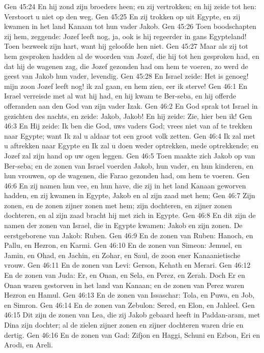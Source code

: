 Gen 45:24  En hij zond zijn broeders heen; en zij vertrokken; en hij zeide tot hen: Verstoort u niet op den weg.
Gen 45:25  En zij trokken op uit Egypte, en zij kwamen in het land Kanaan tot hun vader Jakob.
Gen 45:26  Toen boodschapten zij hem, zeggende: Jozef leeft nog, ja, ook is hij regeerder in gans Egypteland! Toen bezweek zijn hart, want hij geloofde hen niet.
Gen 45:27  Maar als zij tot hem gesproken hadden al de woorden van Jozef, die hij tot hen gesproken had, en dat hij de wagenen zag, die Jozef gezonden had om hem te voeren, zo werd de geest van Jakob hun vader, levendig.
Gen 45:28  En Israel zeide: Het is genoeg! mijn zoon Jozef leeft nog! ik zal gaan, en hem zien, eer ik sterve!
Gen 46:1  En Israel verreisde met al wat hij had, en hij kwam te Ber-seba, en hij offerde offeranden aan den God van zijn vader Izak.
Gen 46:2  En God sprak tot Israel in gezichten des nachts, en zeide: Jakob, Jakob! En hij zeide: Zie, hier ben ik!
Gen 46:3  En Hij zeide: Ik ben die God, uws vaders God; vrees niet van af te trekken naar Egypte; want Ik zal u aldaar tot een groot volk zetten.
Gen 46:4  Ik zal met u aftrekken naar Egypte en Ik zal u doen weder optrekken, mede optrekkende; en Jozef zal zijn hand op uw ogen leggen.
Gen 46:5  Toen maakte zich Jakob op van Ber-seba; en de zonen van Israel voerden Jakob, hun vader, en hun kinderen, en hun vrouwen, op de wagenen, die Farao gezonden had, om hem te voeren.
Gen 46:6  En zij namen hun vee, en hun have, die zij in het land Kanaan geworven hadden, en zij kwamen in Egypte, Jakob en al zijn zaad met hem;
Gen 46:7  Zijn zonen, en de zonen zijner zonen met hem; zijn dochteren, en zijner zonen dochteren, en al zijn zaad bracht hij met zich in Egypte.
Gen 46:8  En dit zijn de namen der zonen van Israel, die in Egypte kwamen: Jakob en zijn zonen. De eerstgeborene van Jakob: Ruben.
Gen 46:9  En de zonen van Ruben: Hanoch, en Pallu, en Hezron, en Karmi.
Gen 46:10  En de zonen van Simeon: Jemuel, en Jamin, en Ohad, en Jachin, en Zohar, en Saul, de zoon ener Kanaanietische vrouw.
Gen 46:11  En de zonen van Levi: Gerson, Kehath en Merari.
Gen 46:12  En de zonen van Juda: Er, en Onan, en Sela, en Perez, en Zerah. Doch Er en Onan waren gestorven in het land van Kanaan; en de zonen van Perez waren Hezron en Hamul.
Gen 46:13  En de zonen van Issaschar: Tola, en Puwa, en Job, en Simron.
Gen 46:14  En de zonen van Zebulon: Sered, en Elon, en Jahleel.
Gen 46:15  Dit zijn de zonen van Lea, die zij Jakob gebaard heeft in Paddan-aram, met Dina zijn dochter; al de zielen zijner zonen en zijner dochteren waren drie en dertig.
Gen 46:16  En de zonen van Gad: Zifjon en Haggi, Schuni en Ezbon, Eri en Arodi, en Areli.
